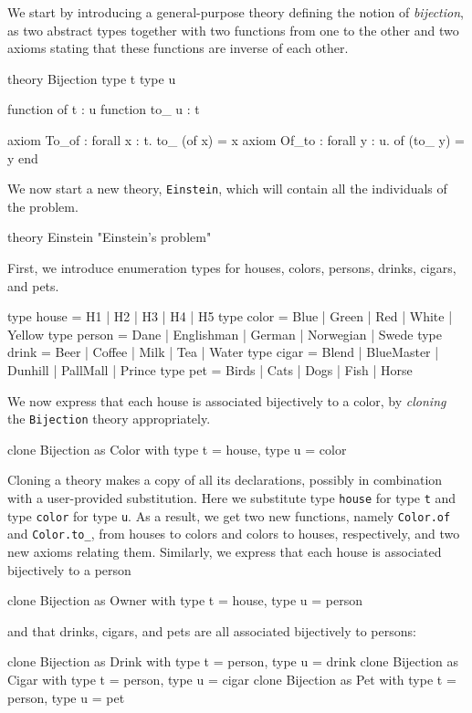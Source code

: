 We start by introducing a general-purpose theory defining the notion
of \emph{bijection}, as two abstract types together with two functions from
one to the other and two axioms stating that these functions are
inverse of each other.
\begin{whycode}
theory Bijection
  type t
  type u

  function of t : u
  function to_ u : t

  axiom To_of : forall x : t. to_ (of x) = x
  axiom Of_to : forall y : u. of (to_ y) = y
end
\end{whycode}

We now start a new theory, \texttt{Einstein}, which will contain all
the individuals of the problem.
\begin{whycode}
theory Einstein "Einstein's problem"
\end{whycode}
First, we introduce enumeration types for houses, colors, persons,
drinks, cigars, and pets.
\begin{whycode}
  type house  = H1 | H2 | H3 | H4 | H5
  type color  = Blue | Green | Red | White | Yellow
  type person = Dane | Englishman | German | Norwegian | Swede
  type drink  = Beer | Coffee | Milk | Tea | Water
  type cigar  = Blend | BlueMaster | Dunhill | PallMall | Prince
  type pet    = Birds | Cats | Dogs | Fish | Horse
\end{whycode}
We now express that each house is associated bijectively to a color,
by \emph{cloning} the \texttt{Bijection} theory appropriately.
\begin{whycode}
  clone Bijection as Color with type t = house, type u = color
\end{whycode}
Cloning a theory makes a copy of all its declarations, possibly in
combination with a user-provided substitution. Here we substitute
type \texttt{house} for type \texttt{t} and type \texttt{color}
for type \texttt{u}.
As a result, we get two new functions, namely \texttt{Color.of} and
\texttt{Color.to\_}, from houses to colors and colors to houses,
respectively, and two new axioms relating them.
Similarly, we express that each house is associated bijectively to a
person
\begin{whycode}
  clone Bijection as Owner with type t = house, type u = person
\end{whycode}
and that drinks, cigars, and pets are all associated bijectively to persons:
\begin{whycode}
  clone Bijection as Drink with type t = person, type u = drink
  clone Bijection as Cigar with type t = person, type u = cigar
  clone Bijection as Pet   with type t = person, type u = pet
\end{whycode}
